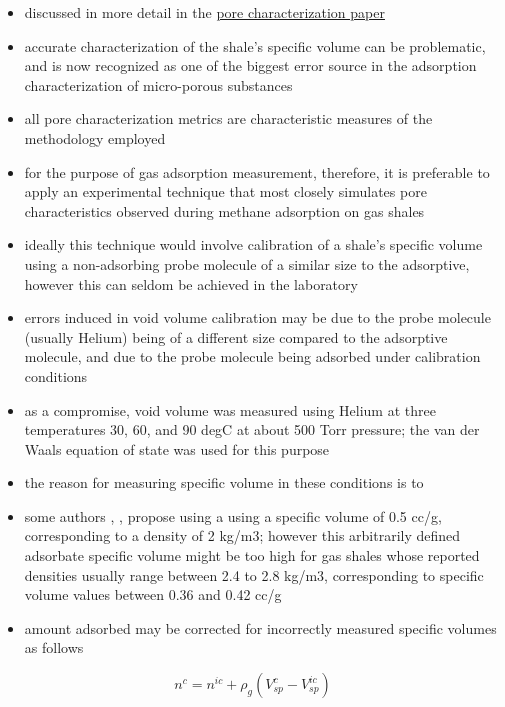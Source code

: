 \documentclass[11pt]{article}
\begin{document}
\begin{enumerate}
\begin{itemize}
\item discussed in more detail in the \href{bowlandpore.org}{pore characterization paper}
\item accurate characterization of the shale's specific volume can be problematic, and is now recognized as one of the biggest error source in the adsorption characterization of micro-porous substances \cite{Rouquerol2016}
\item all pore characterization metrics are characteristic measures of the methodology employed
\item for the purpose of gas adsorption measurement, therefore, it is preferable to apply an experimental technique that most closely simulates pore characteristics observed during methane adsorption on gas shales
\item ideally this technique would involve calibration of a shale's specific volume using a non-adsorbing probe molecule of a similar size to the adsorptive, however this can seldom be achieved in the laboratory
\item errors induced in void volume calibration may be due to the probe molecule (usually Helium) being of a different size compared to the adsorptive molecule, and due to the probe molecule being adsorbed under calibration conditions
\item as a compromise, void volume was measured using Helium at three temperatures 30, 60, and 90 degC at about 500 Torr pressure; the van der Waals equation of state was used for this purpose
\item the reason for measuring specific volume in these conditions is to
\item some authors \cite{Rouquerol2016}, \cite{Brandani2017}, \cite{Pini2014} propose using a using a specific volume of 0.5 cc/g, corresponding to a density of 2 kg/m3; however this arbitrarily defined adsorbate specific volume might be too high for gas shales whose reported densities usually range between 2.4 to 2.8 kg/m3, corresponding to specific volume values between 0.36 and 0.42 cc/g
\item amount adsorbed may be corrected for incorrectly measured specific volumes as follows
\end{itemize}
\begin{equation}
n ^{c} = n ^{ic} + \rho _g ( V _{sp} ^{c} - V _{sp} ^{ic} )
\end{equation}
\end{enumerate}
\end{document}

